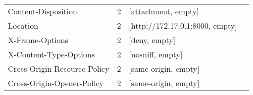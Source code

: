 \begin{tabular}{lrp{9cm}p{4cm}}
                        Content-Disposition &        2 &                                                                                                                                                                                                                                                                                                                                        [attachment, empty] &                                                                                    \\
                    Location &        2 &                                                                                                                                                                                                                                                                                                                            [http://172.17.0.1:8000, empty] &                                                                                    \\
             X-Frame-Options &        2 &                                                                                                                                                                                                                                                                                                                                              [deny, empty] &                                                                                    \\
      X-Content-Type-Options &        2 &                                                                                                                                                                                                                                                                                                                                           [nosniff, empty] &                                                                                    \\


Cross-Origin-Resource-Policy &        2 &                                                                                                                                                                                                                                                                                                                                       [same-origin, empty] &                                                                                    \\
  Cross-Origin-Opener-Policy &        2 &                                                                                                                                                                                                                                                                                                                                       [same-origin, empty] &                                                                                    \\
\bottomrule
\end{tabular}

